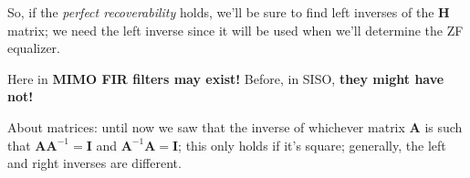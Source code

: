 \documentclass[a4paper, 12pt]{book}
\begin{document}
So, if the \textit{perfect recoverability} holds, we'll be sure to find left inverses of the $\mathbf{H}$ matrix; we need the left inverse since it will be used when we'll determine the ZF equalizer.


Here in \textbf{MIMO FIR filters may exist!} Before, in SISO, \textbf{they might have not!}

About matrices: until now we saw that the inverse of whichever matrix $\boldsymbol{A}$ is such that $\boldsymbol{A}\boldsymbol{A}^{-1} = \boldsymbol{I}$ and $\boldsymbol{A}^{-1}\boldsymbol{A} = \boldsymbol{I}$; this only holds if it's square; generally, the left and right inverses are different.

\vspace{1em}

\noindent
{}

\vspace{1em}
\end{document}
